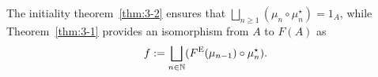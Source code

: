 The initiality theorem~\ref{thm:3-2} ensures that \(\bigsqcup_{n \ge 1}(\mu_n \circ \mu_n^\star) = 1_A\), while Theorem~\ref{thm:3-1} provides an isomorphism from \(A\) to \(F(A)\) as
\begin{equation*}
  f := \bigsqcup_{n \in \mathbb{N}}(F^\textup{E}(\mu_{n-1}) \circ \mu_n^\star).
\end{equation*}

